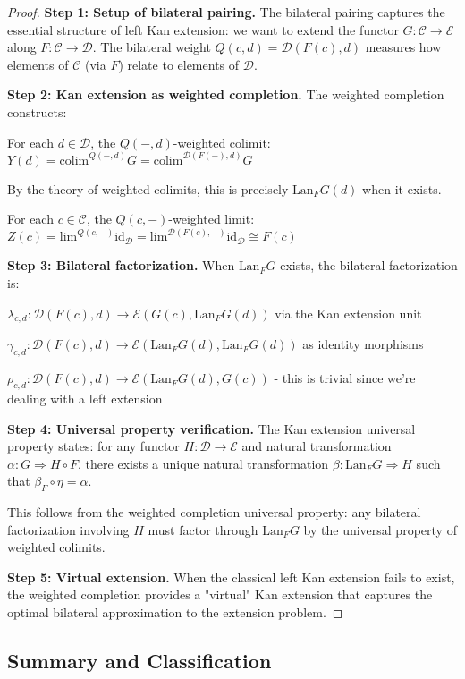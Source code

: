 \documentclass[11pt]{article}
\theoremstyle{plain}
\theoremstyle{definition}
\theoremstyle{remark}
\newcommand{\C}{\mathcal{C}}
\newcommand{\D}{\mathcal{D}}
\newcommand{\E}{\mathcal{E}}
\newcommand{\colim}{\mathrm{colim}}
\renewcommand{\lim}{\mathrm{lim}}
\begin{document}
\begin{proof}
\textbf{Step 1: Setup of bilateral pairing.}
The bilateral pairing captures the essential structure of left Kan extension: we want to extend the functor $G : \C \to \E$ along $F : \C \to \D$. The bilateral weight $Q(c, d) = \D(F(c), d)$ measures how elements of $\C$ (via $F$) relate to elements of $\D$.

\textbf{Step 2: Kan extension as weighted completion.}
The weighted completion constructs:

For each $d \in \D$, the $Q(-, d)$-weighted colimit:
$Y(d) = \colim^{Q(-, d)} G = \colim^{\D(F(-), d)} G$

By the theory of weighted colimits, this is precisely $\text{Lan}_F G(d)$ when it exists.

For each $c \in \C$, the $Q(c, -)$-weighted limit:
$Z(c) = \lim^{Q(c, -)} \text{id}_\D = \lim^{\D(F(c), -)} \text{id}_\D \cong F(c)$

\textbf{Step 3: Bilateral factorization.}
When $\text{Lan}_F G$ exists, the bilateral factorization is:

$\lambda_{c,d} : \D(F(c), d) \to \E(G(c), \text{Lan}_F G(d))$ via the Kan extension unit

$\gamma_{c,d} : \D(F(c), d) \to \E(\text{Lan}_F G(d), \text{Lan}_F G(d))$ as identity morphisms

$\rho_{c,d} : \D(F(c), d) \to \E(\text{Lan}_F G(d), G(c))$ - this is trivial since we're dealing with a left extension

\textbf{Step 4: Universal property verification.}
The Kan extension universal property states: for any functor $H : \D \to \E$ and natural transformation $\alpha : G \Rightarrow H \circ F$, there exists a unique natural transformation $\beta : \text{Lan}_F G \Rightarrow H$ such that $\beta_F \circ \eta = \alpha$.

This follows from the weighted completion universal property: any bilateral factorization involving $H$ must factor through $\text{Lan}_F G$ by the universal property of weighted colimits.

\textbf{Step 5: Virtual extension.}
When the classical left Kan extension fails to exist, the weighted completion provides a "virtual" Kan extension that captures the optimal bilateral approximation to the extension problem.
\end{proof}

\subsection{Summary and Classification}
\end{document}
